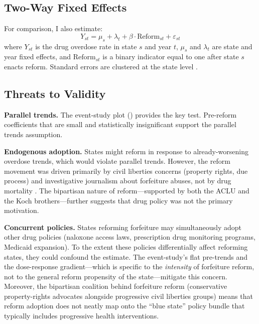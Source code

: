\documentclass[12pt]{article}
\begin{document}
\subsection{Two-Way Fixed Effects}

For comparison, I also estimate:
\begin{equation}
Y_{st} = \mu_s + \lambda_t + \beta \cdot \text{Reform}_{st} + \varepsilon_{st}
\label{eq:twfe}
\end{equation}
where $Y_{st}$ is the drug overdose rate in state $s$ and year $t$, $\mu_s$ and $\lambda_t$ are state and year fixed effects, and $\text{Reform}_{st}$ is a binary indicator equal to one after state $s$ enacts reform. Standard errors are clustered at the state level \citep{cameron2015practitioner}.

\subsection{Threats to Validity}

\textbf{Parallel trends.} The event-study plot () provides the key test. Pre-reform coefficients that are small and statistically insignificant support the parallel trends assumption.

\textbf{Endogenous adoption.} States might reform in response to already-worsening overdose trends, which would violate parallel trends. However, the reform movement was driven primarily by civil liberties concerns (property rights, due process) and investigative journalism about forfeiture abuses, not by drug mortality \citep{ij2020policing}. The bipartisan nature of reform---supported by both the ACLU and the Koch brothers---further suggests that drug policy was not the primary motivation.

\textbf{Concurrent policies.} States reforming forfeiture may simultaneously adopt other drug policies (naloxone access laws, prescription drug monitoring programs, Medicaid expansion). To the extent these policies differentially affect reforming states, they could confound the estimate. The event-study's flat pre-trends and the dose-response gradient---which is specific to the \emph{intensity} of forfeiture reform, not to the general reform propensity of the state---mitigate this concern. Moreover, the bipartisan coalition behind forfeiture reform (conservative property-rights advocates alongside progressive civil liberties groups) means that reform adoption does not neatly map onto the ``blue state'' policy bundle that typically includes progressive health interventions.
\end{document}
